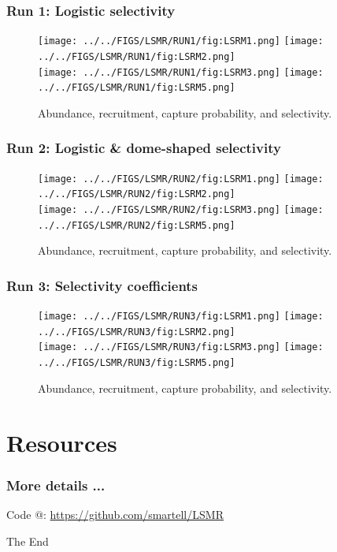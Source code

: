 \documentclass{beamer}
\begin{document}
\begin{frame}
	\frametitle{Run 1: Logistic selectivity}
	\begin{figure}[htbp]
		\centering
			\texttt{[image: ../../FIGS/LSMR/RUN1/fig:LSRM1.png]}
			\texttt{[image: ../../FIGS/LSMR/RUN1/fig:LSRM2.png]}\\
			\texttt{[image: ../../FIGS/LSMR/RUN1/fig:LSRM3.png]}
			\texttt{[image: ../../FIGS/LSMR/RUN1/fig:LSRM5.png]}
		\caption{Abundance, recruitment, capture probability, and selectivity.}
		\label{fig:FIGS_LSMR_RUN1_fig:LSRM1}
	\end{figure}
	
\end{frame}

\begin{frame}
	\frametitle{Run 2: Logistic \& dome-shaped selectivity}
	\begin{figure}[htbp]
		\centering
			\texttt{[image: ../../FIGS/LSMR/RUN2/fig:LSRM1.png]}
			\texttt{[image: ../../FIGS/LSMR/RUN2/fig:LSRM2.png]}\\
			\texttt{[image: ../../FIGS/LSMR/RUN2/fig:LSRM3.png]}
			\texttt{[image: ../../FIGS/LSMR/RUN2/fig:LSRM5.png]}
		\caption{Abundance, recruitment, capture probability, and selectivity.}
		\label{fig:FIGS_LSMR_RUN2_fig:LSRM1}
	\end{figure}
	
\end{frame}

\begin{frame}
	\frametitle{Run 3: Selectivity coefficients}
	\begin{figure}[htbp]
		\centering
			\texttt{[image: ../../FIGS/LSMR/RUN3/fig:LSRM1.png]}
			\texttt{[image: ../../FIGS/LSMR/RUN3/fig:LSRM2.png]}\\
			\texttt{[image: ../../FIGS/LSMR/RUN3/fig:LSRM3.png]}
			\texttt{[image: ../../FIGS/LSMR/RUN3/fig:LSRM5.png]}
		\caption{Abundance, recruitment, capture probability, and selectivity.}
		\label{fig:FIGS_LSMR_RUN3_fig:LSRM1}
	\end{figure}
	
\end{frame}




% 
\section{Resources} %
\label{sec:resources}


\begin{frame}
	\frametitle{More details ...}
	
	Code @:
	\url{https://github.com/smartell/LSMR}
\end{frame}



 
\begin{frame}
\centerline{The End}
\end{frame}
\end{document}
